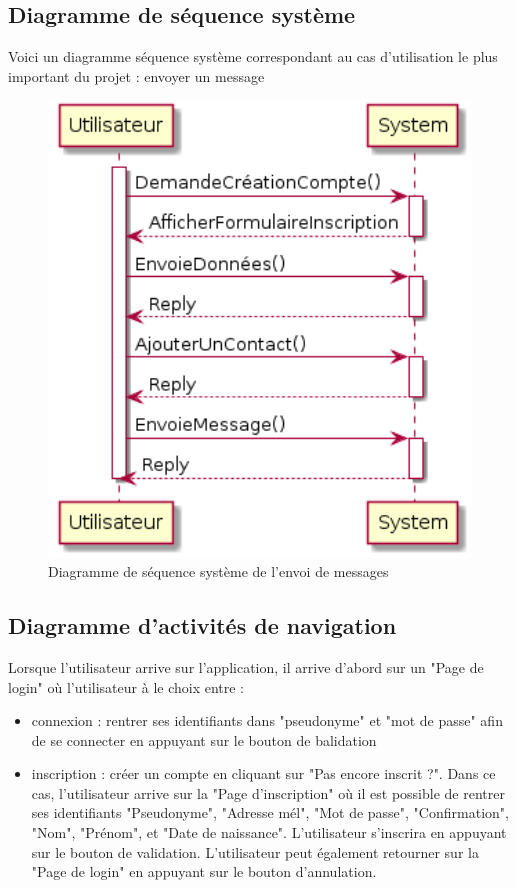 \documentclass[a4paper,12pt]{article}
\begin{document}
	\subsection{Diagramme de séquence système}
	Voici un diagramme séquence système correspondant au cas d'utilisation le plus important du projet : envoyer un message
	\begin{figure}[H]
		\centerline{\includegraphics[width=12.5cm]{../diagrammes/img/sequenceSystemeEnvoiMessage.png}}
		\caption{Diagramme de séquence système de l'envoi de messages}
	\end{figure}

	\newpage

	\subsection{Diagramme d'activités de navigation}
	Lorsque l'utilisateur arrive sur l'application, il arrive d'abord sur un "Page de login" où l'utilisateur à le choix entre :
	\begin{itemize}
		\item connexion : rentrer ses identifiants dans "pseudonyme" et "mot de passe" afin de se connecter en appuyant sur le bouton de balidation
		\item inscription : créer un compte en cliquant sur "Pas encore inscrit ?".
		Dans ce cas, l'utilisateur arrive sur la "Page d'inscription" où il est possible de rentrer ses identifiants "Pseudonyme", "Adresse mél", "Mot de passe", "Confirmation", "Nom", "Prénom", et "Date de naissance".
		L'utilisateur s'inscrira en appuyant sur le bouton de validation.
		L'utilisateur peut également retourner sur la "Page de login" en appuyant sur le bouton d'annulation.\\
	\end{itemize}
\end{document}
